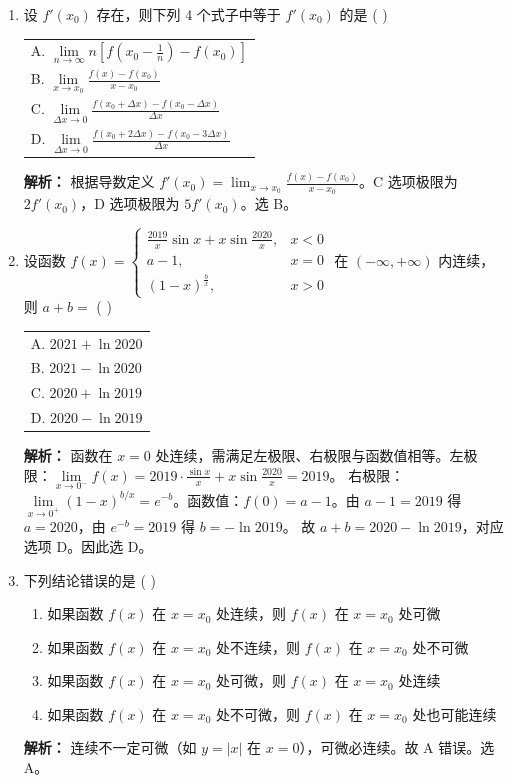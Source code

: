 \documentclass[10pt, a3paper, landscape, twocolumn]{article}
\begin{document}
\begin{enumerate}
    \item 设 $f'(x_0)$ 存在，则下列 4 个式子中等于 $f'(x_0)$ 的是 ( \quad ) \\
    \begin{tabularx}{\linewidth}{@{} X @{}}
        A. $\lim\limits_{n \to \infty} n \left[ f\left(x_0 - \frac{1}{n}\right) - f(x_0) \right]$ \\
        B. $\lim\limits_{x \to x_0} \frac{f(x) - f(x_0)}{x - x_0}$ \\
        C. $\lim\limits_{\Delta x \to 0} \frac{f(x_0 + \Delta x) - f(x_0 - \Delta x)}{\Delta x}$ \\
        D. $\lim\limits_{\Delta x \to 0} \frac{f(x_0 + 2\Delta x) - f(x_0 - 3\Delta x)}{\Delta x}$
    \end{tabularx}
    {\color{red} \footnotesize \textbf{解析：} 根据导数定义 $f'(x_0) = \lim_{x \to x_0} \frac{f(x)-f(x_0)}{x-x_0}$。C 选项极限为 $2f'(x_0)$，D 选项极限为 $5f'(x_0)$。选 B。}
    \item 设函数 
    $f(x) = \begin{cases} 
    \frac{2019}{x} \sin x + x \sin \frac{2020}{x}, & x < 0 \\
    a - 1, & x = 0 \\
    (1 - x)^{\frac{b}{x}}, & x > 0
    \end{cases}$ 
    在 $(-\infty, +\infty)$ 内连续，则 $a+b = $ ( \quad ) \\
    \begin{tabularx}{\linewidth}{@{} *{1}{X} @{}}
        A. $2021 + \ln 2020$ \\
        B. $2021 - \ln 2020$ \\
        C. $2020 + \ln 2019$ \\
        D. $2020 - \ln 2019$
    \end{tabularx}
    {\color{red} \footnotesize \textbf{解析：} 函数在 $x=0$ 处连续，需满足左极限、右极限与函数值相等。左极限：$\lim\limits_{x \to 0^-} f(x) = 2019 \cdot \frac{\sin x}{x} + x \sin \frac{2020}{x} = 2019$。
    \newline 右极限：$\lim\limits_{x \to 0^+} (1-x)^{b/x} = e^{-b}$。函数值：$f(0)=a-1$。由 $a-1=2019$ 得 $a=2020$，由 $e^{-b}=2019$ 得 $b=-\ln 2019$。
    \newline 故 $a+b = 2020 - \ln 2019$，对应选项 D。因此选 D。}
    \item 下列结论错误的是 ( \quad ) \\
    \begin{enumerate}[label=\Alph{enumii}., leftmargin=2em]
        \item 如果函数 $f(x)$ 在 $x=x_0$ 处连续，则 $f(x)$ 在 $x=x_0$ 处可微
        \item 如果函数 $f(x)$ 在 $x=x_0$ 处不连续，则 $f(x)$ 在 $x=x_0$ 处不可微
        \item 如果函数 $f(x)$ 在 $x=x_0$ 处可微，则 $f(x)$ 在 $x=x_0$ 处连续
        \item 如果函数 $f(x)$ 在 $x=x_0$ 处不可微，则 $f(x)$ 在 $x=x_0$ 处也可能连续
    \end{enumerate}
    {\color{red} \footnotesize \textbf{解析：} 连续不一定可微（如 $y=|x|$ 在 $x=0$），可微必连续。故 A 错误。选 A。}


\end{enumerate}
\end{document}

